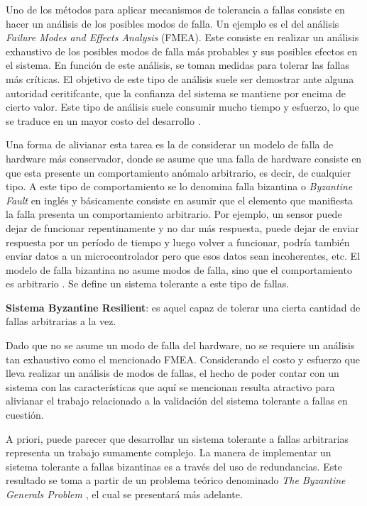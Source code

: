 Uno de los métodos para aplicar mecanismos de tolerancia a fallas consiste en hacer un análisis de los posibles modos de falla. Un ejemplo es el del análisis \textit{Failure Modes and Effects Analysis} (FMEA). Este consiste en realizar un análisis exhaustivo de los posibles modos de falla más probables y sus posibles efectos en el sistema. En función de este análisis, se toman medidas para tolerar las fallas más críticas. El objetivo de este tipo de análisis suele ser demostrar ante alguna autoridad ceritifcante, que la confianza del sistema se mantiene por encima de cierto valor. Este tipo de análisis suele consumir mucho tiempo y esfuerzo, lo que se traduce en un mayor costo del desarrollo \cite{lala1994architectural}.

Una forma de alivianar esta tarea es la de considerar un modelo de falla de hardware más conservador, donde se asume que una falla de hardware consiste en que esta presente un comportamiento anómalo arbitrario, es decir, de cualquier tipo. A este tipo de comportamiento se lo denomina falla bizantina o \textit{Byzantine Fault} en inglés y básicamente consiste en asumir que el elemento que manifiesta la falla presenta un comportamiento arbitrario. Por ejemplo, un sensor puede dejar de funcionar repentinamente y no dar más respuesta, puede dejar de enviar respuesta por un período de tiempo y luego volver a funcionar, podría también enviar datos a un microcontrolador pero que esos datos sean incoherentes, etc. El modelo de falla bizantina no asume modos de falla, sino que el comportamiento es arbitrario \cite{roth2021not}\cite{hiergeist2017internal}\cite{lala1994architectural}. Se define un sistema tolerante a este tipo de fallas.

\begin{mydef}
    \textbf{Sistema Byzantine Resilient}: es aquel capaz de tolerar una cierta cantidad de fallas arbitrarias a la vez.
\end{mydef}

Dado que no se asume un modo de falla del hardware, no se requiere un análisis tan exhaustivo como el mencionado FMEA. Considerando el costo y esfuerzo que lleva realizar un análisis de modos de fallas, el hecho de poder contar con un sistema con las características que aquí se mencionan resulta atractivo para alivianar el trabajo relacionado a la validación del sistema tolerante a fallas en cuestión.

A priori, puede parecer que desarrollar un sistema tolerante a fallas arbitrarias representa un trabajo sumamente complejo. La manera de implementar un sistema tolerante a fallas bizantinas es a través del uso de redundancias. Este resultado se toma a partir de un problema teórico denominado \textit{The Byzantine Generals Problem} \cite{lamport2019byzantine}, el cual se presentará más adelante.

